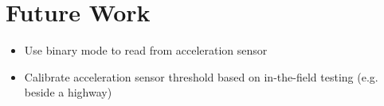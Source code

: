 \chapter{Future Work}

\begin{itemize}
	\item Use binary mode to read from acceleration sensor
	\item Calibrate acceleration sensor threshold based on in-the-field testing (e.g. beside a highway)
\end{itemize}

\clearpage